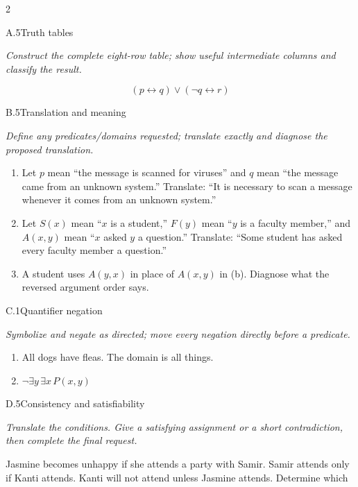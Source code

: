 \documentclass[9pt]{extarticle}
\begin{document}
\CoreWorkArea
\FormBreak
{}
\begin{multicols}{2}
\begin{CoreProblem}{A.5}{Truth tables}
{\scriptsize\textit{Construct the complete eight-row table; show useful intermediate columns and classify the result.}\par}
\[
  (p\leftrightarrow q)\lor(\neg q\leftrightarrow r)
\]
\end{CoreProblem}
\begin{CoreProblem}{B.5}{Translation and meaning}
{\scriptsize\textit{Define any predicates/domains requested; translate exactly and diagnose the proposed translation.}\par}
\begin{enumerate}[label=(\alph*)]
  \item Let $p$ mean ``the message is scanned for viruses'' and $q$ mean ``the
        message came from an unknown system.'' Translate: ``It is necessary to
        scan a message whenever it comes from an unknown system.''
  \item Let $S(x)$ mean ``$x$ is a student,'' $F(y)$ mean ``$y$ is a faculty
        member,'' and $A(x,y)$ mean ``$x$ asked $y$ a question.'' Translate:
        ``Some student has asked every faculty member a question.''
  \item A student uses $A(y,x)$ in place of $A(x,y)$ in (b). Diagnose what the
        reversed argument order says.
\end{enumerate}
\end{CoreProblem}
\begin{CoreProblem}{C.1}{Quantifier negation}
{\scriptsize\textit{Symbolize and negate as directed; move every negation directly before a predicate.}\par}
\begin{enumerate}[label=(\alph*)]
  \item All dogs have fleas. The domain is all things.
  \item $\neg\exists y\,\exists x\,P(x,y)$
\end{enumerate}
\end{CoreProblem}
\columnbreak
\begin{CoreProblem}{D.5}{Consistency and satisfiability}
{\scriptsize\textit{Translate the conditions. Give a satisfying assignment or a short contradiction, then complete the final request.}\par}
Jasmine becomes unhappy if she attends a party with Samir. Samir attends only
if Kanti attends. Kanti will not attend unless Jasmine attends. Determine which

\end{CoreProblem}
\end{multicols}
\end{document}
